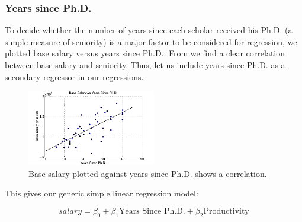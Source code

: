 
\subsubsection{Years since Ph.D.}

To decide whether the number of years since each scholar received his Ph.D. (a simple measure of seniority) is a major factor to be considered for regression, we plotted base salary versus years since Ph.D.. From  we find a clear correlation between base salary and seniority. Thus, let us include years since Ph.D. as a secondary regressor in our regressions.

\begin{figure}[h]
\label{figYearPhD}
\centering
\includegraphics[width=0.5\textwidth]{figures/yrPhD.png}
\caption{Base salary plotted against years since Ph.D. shows a correlation.}
\end{figure}

This gives our generic simple linear regression model:

\begin{equation}
  \label{eqnourmodel}
  salary = \beta_0 + \beta_1 \text{Years Since Ph.D.} + \beta_2 \text{Productivity}
\end{equation}
